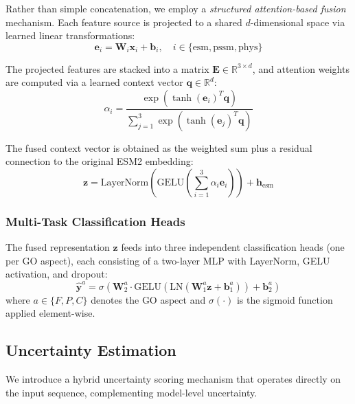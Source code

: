 \documentclass[conference]{IEEEtran}
\begin{document}
Rather than simple concatenation, we employ a \textit{structured attention-based fusion} mechanism. Each feature source is projected to a shared $d$-dimensional space via learned linear transformations:
\begin{equation}
    \mathbf{e}_i = \mathbf{W}_i \mathbf{x}_i + \mathbf{b}_i, \quad i \in \{\text{esm}, \text{pssm}, \text{phys}\}
\end{equation}

The projected features are stacked into a matrix $\mathbf{E} \in \mathbb{R}^{3 \times d}$, and attention weights are computed via a learned context vector $\mathbf{q} \in \mathbb{R}^d$:
\begin{equation}
    \alpha_i = \frac{\exp(\tanh(\mathbf{e}_i)^T \mathbf{q})}{\sum_{j=1}^{3} \exp(\tanh(\mathbf{e}_j)^T \mathbf{q})}
\end{equation}

The fused context vector is obtained as the weighted sum plus a residual connection to the original ESM2 embedding:
\begin{equation}
    \mathbf{z} = \text{LayerNorm}\left(\text{GELU}\left(\sum_{i=1}^{3} \alpha_i \mathbf{e}_i\right)\right) + \mathbf{h}_{\text{esm}}
\end{equation}

\subsubsection{Multi-Task Classification Heads}
The fused representation $\mathbf{z}$ feeds into three independent classification heads (one per GO aspect), each consisting of a two-layer MLP with LayerNorm, GELU activation, and dropout:
\begin{equation}
    \hat{\mathbf{y}}^a = \sigma(\mathbf{W}_2^a \cdot \text{GELU}(\text{LN}(\mathbf{W}_1^a \mathbf{z} + \mathbf{b}_1^a)) + \mathbf{b}_2^a)
\end{equation}
where $a \in \{F, P, C\}$ denotes the GO aspect and $\sigma(\cdot)$ is the sigmoid function applied element-wise.

\subsection{Uncertainty Estimation}

We introduce a hybrid uncertainty scoring mechanism that operates directly on the input sequence, complementing model-level uncertainty.
\end{document}
